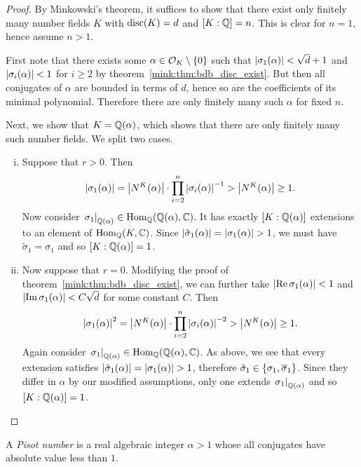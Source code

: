 \begin{proof}
By Minkowski's theorem, it suffices to show that there exist only
finitely many number fields $K$ with $\operatorname{disc}(K) = d$ and
$[K : \mathbb{Q}] = n$. This is clear for $n=1$, hence assume $n>1$.

First note that there exists some
$\alpha \in \mathcal{O}_K \setminus \left\{0\right\}$ such that
$\left\lvert \sigma_1(\alpha)\right\rvert < \sqrt{d}+1$ and
$\left\lvert \sigma_i(\alpha)\right\rvert < 1$ for $i \geq 2$ by
theorem~\ref{mink:thm:bdb_disc_exist}. But then all conjugates of
$\alpha$ are bounded in terms of $d$, hence so are the coefficients
of its minimal polynomial. Therefore there are only finitely many
such $\alpha$ for fixed $n$.

Next, we show that $K = \mathbb{Q}(\alpha)$, which shows that there are
only finitely many such number fields. We split two cases.

\begin{enumerate}[i)]
\item Suppose that $r > 0$. Then
\[
\left\lvert \sigma_1(\alpha)\right\rvert =
\left\lvert N^K(\alpha)\right\rvert \cdot \prod_{i=2}^n \left\lvert \sigma_i(\alpha)\right\rvert^{-1} >
\left\lvert N^K(\alpha)\right\rvert \geq 1.
\]
Now consider
$\left. \sigma_1\right|_{\mathbb{Q}(\alpha)}^{} \in \operatorname{Hom}_{\mathbb{Q}}(\mathbb{Q}(\alpha), \mathbb{C})$. It has
exactly $[K : \mathbb{Q}(\alpha)]$ extensions to an element of
$\operatorname{Hom}_{\mathbb{Q}}(K, \mathbb{C})$. Since
$\left\lvert \tilde{\sigma}_1(\alpha)\right\rvert = \left\lvert \sigma_1(\alpha)\right\rvert > 1$,
we must have $\tilde{\sigma}_1 = \sigma_1$ and so
$[K : \mathbb{Q}(\alpha)] = 1$.

\item Now suppose that $r=0$. Modifying the proof of
theorem~\ref{mink:thm:bdb_disc_exist}, we can further take
$\left\lvert \operatorname{Re} \sigma_1(\alpha)\right\rvert < 1$ and
$\left\lvert \operatorname{Im} \sigma_1(\alpha)\right\rvert < C \sqrt{d}$ for some constant $C$.
Then
\[
\left\lvert \sigma_1(\alpha)\right\rvert^2 =
\left\lvert N^K(\alpha)\right\rvert \cdot \prod_{i=2}^n \left\lvert \sigma_i(\alpha)\right\rvert^{-2} >
\left\lvert N^K(\alpha)\right\rvert \geq 1.
\]
Again consider
$\left. \sigma_1\right|_{\mathbb{Q}(\alpha)}^{} \in \operatorname{Hom}_{\mathbb{Q}}(\mathbb{Q}(\alpha), \mathbb{C})$. As
above, we see that every extension satisfies
$\left\lvert \tilde{\sigma}_1(\alpha)\right\rvert = \left\lvert \sigma_1(\alpha)\right\rvert > 1$,
therefore $\tilde{\sigma}_1 \in \left\{\sigma_1, \overline{\sigma}_1\right\}$.
Since they differ in $\alpha$ by our modified assumptions, only one
extends $\left. \sigma_1\right|_{\mathbb{Q}(\alpha)}^{}$ and so
$[K : \mathbb{Q}(\alpha)] = 1$.
\qedhere
\end{enumerate}
\end{proof}

\begin{opomba}
A \emph{Pisot number} is a real algebraic
integer $\alpha > 1$ whose all conjugates have absolute value less
than $1$.
\end{opomba}

